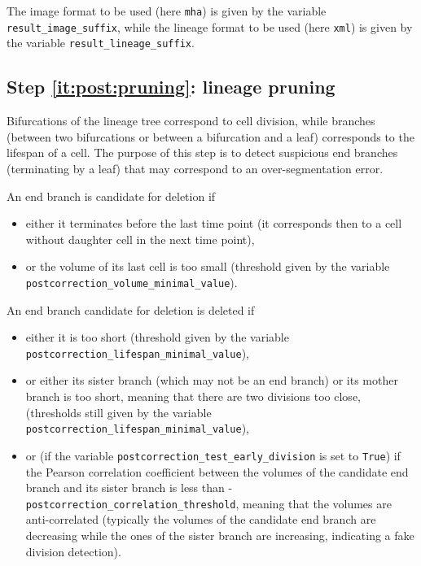 The image format to be used (here \verb|mha|) is given by the variable \texttt{result\_image\_suffix}, while the lineage format to be used (here \verb|xml|) is given by the variable \texttt{result\_lineage\_suffix}.





\subsection{Step \ref{it:post:pruning}: lineage pruning}
\label{sec:cli:post:correction:pruning}

Bifurcations of the lineage tree correspond to cell division, while branches (between two bifurcations or between a bifurcation and a leaf) corresponds to the lifespan of a cell.
The purpose of this step is to detect suspicious end branches (terminating by a leaf) that may correspond to an over-segmentation error. 

An end branch is candidate for deletion if
\begin{itemize}
\itemsep -0.5ex
\item either it terminates before the last time point (it corresponds then to a cell without daughter cell in the next time point), 
\item or the volume of its last cell is too small (threshold given by the variable \texttt{postcorrection\_volume\_minimal\_value}).
\end{itemize}

An end branch candidate for deletion is deleted if
\begin{itemize}
\itemsep -0.5ex
\item either it is too short (threshold given by the variable \texttt{postcorrection\_lifespan\_minimal\_value}),
\item or either its sister branch (which may not be an end branch) or its mother branch is too short, meaning that there are two divisions too close, (thresholds still given by the variable \texttt{postcorrection\_lifespan\_minimal\_value}),
\item or (if the variable \texttt{postcorrection\_test\_early\_division} is set to \texttt{True}) if the Pearson correlation coefficient between the volumes of the candidate end branch and its sister branch is less than 
-\texttt{postcorrection\_correlation\_threshold}, meaning that the volumes are anti-correlated (typically the volumes of the candidate end branch are decreasing while the ones of the sister branch are increasing, indicating a fake division detection).
\end{itemize}

